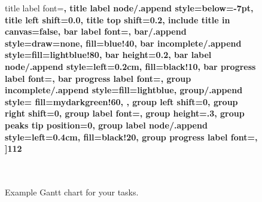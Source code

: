 \begin{itemize}
\begin{figure}[h]
\begin{center}
\begin{ganttchart}
				title label font=\bfseries\footnotesize,
				title label node/.append style={below=-7pt},
				title left shift=0.0,
				title top shift=0.2,
				include title in canvas=false,
				bar label font=\mdseries\small\color{black!90},
				bar/.append style={draw=none, fill=blue!40},
				bar incomplete/.append style={fill=lightblue!80},
				bar height=0.2,
				bar label node/.append style={left=0.2cm, fill=black!10},
				bar progress label font=\bfseries\small,
				bar progress label font=\mdseries\footnotesize\color{black!80},
				group incomplete/.append style={fill=lightblue},
				group/.append style={
					fill=mydarkgreen!60, %
				},
				group left shift=0,
				group right shift=0,
				group label font=\mdseries\bfseries\small\color{black!90},
				group height=.3,
				group peaks tip position=0,
				group label node/.append style={left=0.4cm, fill=black!20},
				group progress label font=\mdseries\footnotesize\color{black!80},
				]{1}{12}
				 \\
				[grid]
				 \\
				[grid]
				 \\
				[grid]
			\end{ganttchart}
		\end{center}
		\caption{Example Gantt chart for your tasks.}
	\end{figure}
	
\end{itemize}
